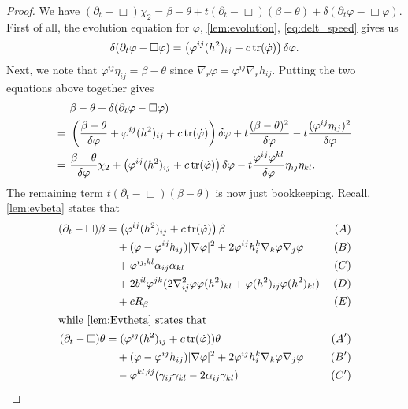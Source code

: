 \documentclass{amsart}
\begin{document}
\begin{proof}
We have
$
(\partial_t - \Box)\chi_2 = \beta - \theta + t(\partial_{t} - \Box)(\beta - \theta) + \delta(\partial_t \varphi - \Box\varphi).
$
First of all, the evolution equation for \(\varphi\), \cref{lem:evolution}, \cref{eq:delt_speed} gives us
\[
\delta(\partial_t \varphi - \Box\varphi) = \left(\varphi^{ij}(h^2)_{ij} + c\operatorname{tr}(\dot{\varphi})\right)\delta\varphi.
\]
Next, we note that
$
\varphi^{ij} \eta_{ij} = \beta - \theta
$
since \(\nabla_r \varphi = \varphi^{ij} \nabla_r h_{ij}\). Putting the two equations above together gives
\begin{equation}
\label{eq:deltchi1}
\begin{split}
&\beta - \theta + \delta(\partial_t \varphi - \Box\varphi) \\
=\ &\left(\frac{\beta-\theta}{\delta\varphi} + \varphi^{ij}(h^2)_{ij} + c\operatorname{tr}(\dot{\varphi})\right)\delta\varphi + t \frac{(\beta - \theta)^2}{\delta\varphi} - t \frac{(\varphi^{ij}\eta_{ij})^2}{\delta\varphi} \\
=\ &\frac{\beta-\theta}{\delta\varphi} \chi_2 + \left(\varphi^{ij}(h^2)_{ij} + c\operatorname{tr}(\dot{\varphi})\right)\delta\varphi  - t \frac{\varphi^{ij}\varphi^{kl}}{\delta\varphi} \eta_{ij}\eta_{kl}.
\end{split}
\end{equation}
The remaining term \(t(\partial_{t} - \Box)(\beta - \theta)\) is now just bookkeeping. Recall, \cref{lem:evbeta} states that
\begin{align*}
(\partial_{t} - \Box)\beta &= \left(\varphi^{ij}(h^2)_{ij} + c\operatorname{tr}(\dot{\p}) \right)\beta  & (A) \\
&\quad + (\varphi - \varphi^{ij}h_{ij}) |\nabla\varphi|^{2} + 2\varphi^{ij}h^{k}_{i}\nabla_k \varphi \nabla_j \varphi  & (B) \\
&\quad + \varphi^{ij,kl} \a_{ij} \a_{kl} & (C) \\
&\quad + 2b^{il}\varphi^{jk} (2\nabla^2_{ij}\varphi\varphi(h^2)_{kl} + \varphi(h^2)_{ij}\varphi(h^2)_{kl}) & (D) \\
&\quad + cR_{\beta}  & (E) \\
\intertext{while \cref{lem:Evtheta} states that}
(\partial_{t} - \Box)\theta &= (\varphi^{ij}(h^2)_{ij} + c\operatorname{tr}(\dot{\p}))\theta & (A') \\
&\quad + (\varphi - \varphi^{ij}h_{ij})|\nabla\varphi|^{2} + 2\varphi^{ij}h^{k}_{i}\nabla_k\varphi\nabla_j\varphi & (B') \\
&\quad - \varphi^{kl,ij} (\gamma_{ij}\gamma_{kl}  - 2\a_{ij} \gamma_{kl}) & (C') \\

\end{align*}
\end{proof}
\end{document}
